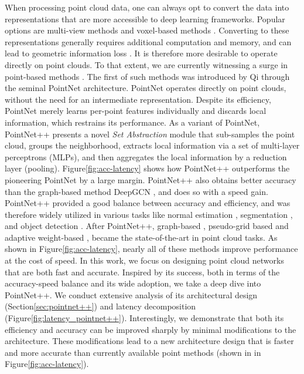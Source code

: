 \documentclass{article}
\newcommand{\figLabel}{Figure\xspace}
\newcommand{\secLabel}{Section\xspace}
\begin{document}
When processing point cloud data, one can always opt to convert the data into representations that are more accessible to deep learning frameworks. Popular options are multi-view methods \cite{Su2015MultiviewCN, Feng2018GVCNNGC, Wei2020ViewGCNVG} and voxel-based methods \cite{Graham20183DSS, Yan2018SECONDSE}. Converting to these representations generally requires additional computation and memory, and can lead to geometric information loss \cite{Liu2019PointVoxelCF}. It is therefore more desirable to operate directly on point clouds. To that extent, we are currently witnessing a surge in point-based methods \cite{Qi2017PointNetDL, Qi2017PointNetDH, dgcnn, Li2019DeepGCNs, Thomas2019KPConvFA, Liu2020ACL}.  
The first of such methods was introduced by Qi \etal through the seminal PointNet \cite{Qi2017PointNetDL} architecture. PointNet operates directly on point clouds, without the need for an intermediate representation. 
Despite its efficiency, PointNet merely learns per-point features individually and discards local information, which restrains its performance. 
As a variant of PointNet, PointNet++ \cite{Qi2017PointNetDH} presents a novel \textit{Set Abstraction} module that sub-samples the point cloud, groups the neighborhood, extracts local information via a set of multi-layer perceptrons (MLPs), and then aggregates the local information by a reduction layer (\ie pooling).  \figLabel \ref{fig:acc-latency} shows how PointNet++ outperforms the pioneering PointNet \cite{Qi2017PointNetDL} by a large margin. 
PointNet++ also obtains better accuracy than the graph-based method DeepGCN \cite{Li2019DeepGCNs}, and does so with a  speed gain.
PointNet++ provided a good balance between accuracy and efficiency, and was therefore widely utilized in various tasks like normal estimation \cite{Guerrero2018PCPNetLL}, segmentation \cite{Qi2019DeepHV,Landrieu2018LargeScalePC}, and object detection \cite{Shi2019PointRCNN3O}.
After PointNet++, graph-based \cite{simonovsky2017dynamic, wang2019graph, dgcnn, Li2019DeepGCNs}, pseudo-grid based \cite{Tatarchenko2018TangentCF, PointCNN,mao2019interpolated,Thomas2019KPConvFA} and adaptive weight-based \cite{wang2018deep,Liu2019RelationShapeCN,accv2018/Groh, PointConv}, became the state-of-the-art in point cloud tasks. As shown in \figLabel \ref{fig:acc-latency}, nearly all of these methods improve performance at the cost of speed.
In this work, we focus on designing point cloud networks that are both fast and accurate. 
Inspired by its success, both in terms of the accuracy-speed balance and its wide adoption, we take a deep dive into PointNet++.
We conduct extensive analysis of its architectural design (\secLabel \ref{sec:pointnet++}) and latency decomposition (\figLabel \ref{fig:latency_pointnet++}). Interestingly, we demonstrate that both its efficiency and accuracy can be improved sharply by minimal modifications to the architecture. These modifications lead to a new architecture design that is faster and more accurate than currently available point methods (shown in \protect{}  in \figLabel \ref{fig:acc-latency}).
\end{document}
